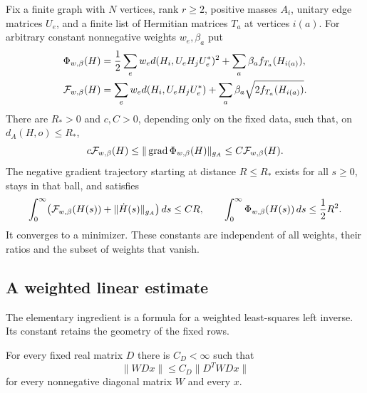 \begin{theorem}\label{thm:finite-force}
Fix a finite graph with $N$ vertices, rank $r\ge2$, positive masses
$A_i$, unitary edge matrices $U_e$, and a finite list of Hermitian
matrices $T_a$ at vertices $i(a)$. For arbitrary constant nonnegative
weights $w_e,\beta_a$ put
\begin{align}
 \Phi_{w,\beta}(H)&=\frac12\sum_e w_e
       d(H_i,U_eH_jU_e^*)^2+\sum_a\beta_a f_{T_a}(H_{i(a)}),
       \label{eq:general-potential}\\
 \mathcal F_{w,\beta}(H)&=\sum_e w_e d(H_i,U_eH_jU_e^*)
           +\sum_a\beta_a\sqrt{2f_{T_a}(H_{i(a)})}.
       \label{eq:force}
\end{align}
There are $R_*>0$ and $c,C>0$, depending only on the fixed data,
such that, on $d_A(H,o)\le R_*$,
\begin{equation}\label{eq:force-gradient}
 c\mathcal F_{w,\beta}(H)\le
 \|\operatorname{grad}\Phi_{w,\beta}(H)\|_{g_A}
 \le C\mathcal F_{w,\beta}(H).
\end{equation}
The negative gradient trajectory starting at distance $R\le R_*$
exists for all $s\ge0$, stays in that ball, and satisfies
\begin{equation}\label{eq:force-integral}
 \int_0^\infty\bigl(\mathcal F_{w,\beta}(H(s))
                   +\|\dot H(s)\|_{g_A}\bigr)\,ds\le CR,
 \qquad
 \int_0^\infty\Phi_{w,\beta}(H(s))\,ds\le\frac12R^2.
\end{equation}
It converges to a minimizer. These constants are independent of all
weights, their ratios and the subset of weights that vanish.
\end{theorem}

\subsection{A weighted linear estimate}
The elementary ingredient is a formula for a weighted least-squares
left inverse. Its constant retains the geometry of the fixed rows.

\begin{lemma}\label{lem:weighted-matrix}
For every fixed real matrix $D$ there is $C_D<\infty$ such that
\begin{equation}\label{eq:weighted-matrix}
 \|WDx\|\le C_D\|D^TWDx\|
\end{equation}
for every nonnegative diagonal matrix $W$ and every $x$.
\end{lemma}

